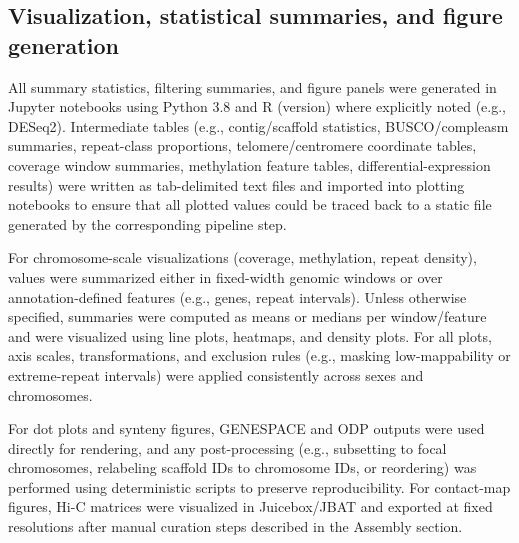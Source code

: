 \documentclass[11pt]{article}
\begin{document}
\subsection{Visualization, statistical summaries, and figure generation}

All summary statistics, filtering summaries, and figure panels were generated in Jupyter notebooks using Python 3.8 and R (version) where explicitly noted (e.g., DESeq2). Intermediate tables (e.g., contig/scaffold statistics, BUSCO/compleasm summaries, repeat-class proportions, telomere/centromere coordinate tables, coverage window summaries, methylation feature tables, differential-expression results) were written as tab-delimited text files and imported into plotting notebooks to ensure that all plotted values could be traced back to a static file generated by the corresponding pipeline step.

For chromosome-scale visualizations (coverage, methylation, repeat density), values were summarized either in fixed-width genomic windows or over annotation-defined features (e.g., genes, repeat intervals). Unless otherwise specified, summaries were computed as means or medians per window/feature and were visualized using line plots, heatmaps, and density plots. For all plots, axis scales, transformations, and exclusion rules (e.g., masking low-mappability or extreme-repeat intervals) were applied consistently across sexes and chromosomes.

For dot plots and synteny figures, GENESPACE and ODP outputs were used directly for rendering, and any post-processing (e.g., subsetting to focal chromosomes, relabeling scaffold IDs to chromosome IDs, or reordering) was performed using deterministic scripts to preserve reproducibility. For contact-map figures, Hi-C matrices were visualized in Juicebox/JBAT and exported at fixed resolutions after manual curation steps described in the Assembly section.



\end{document}
